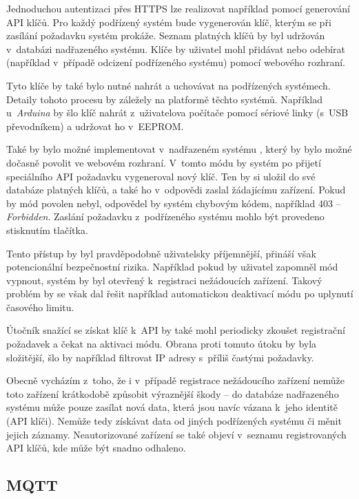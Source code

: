 Jednoduchou autentizaci přes HTTPS lze realizovat například pomocí generování API klíčů. Pro každý podřízený systém bude vygenerován klíč, kterým se při zasílání požadavku systém prokáže. Seznam platných klíčů by byl udržován v~databázi nadřazeného systému. Klíče by uživatel mohl přidávat nebo odebírat (například v~případě odcizení podřízeného systému) pomocí webového rozhraní.

Tyto klíče by také bylo nutné nahrát a uchovávat na podřízených systémech. Detaily tohoto procesu by záležely na platformě těchto systémů. Například u~\textit{Arduina} by šlo klíč nahrát z~uživatelova počítače pomocí sériové linky (s~USB převodníkem) a udržovat ho v~EEPROM.

Také by bylo možné implementovat v~nadřazeném systému , který by bylo možné dočasně povolit ve webovém rozhraní. V~tomto módu by systém po přijetí speciálního API požadavku vygeneroval nový klíč. Ten by si uložil do své databáze platných klíčů, a také ho v~odpovědi zaslal žádajícímu zařízení. Pokud by mód povolen nebyl, odpovědel by systém chybovým kódem, například 403 -- \textit{Forbidden}. Zaslání požadavku z~podřízeného systému mohlo být provedeno stisknutím tlačítka.

Tento přístup by byl pravděpodobně uživatelsky příjemnější, přináší však potencionální bezpečnostní rizika. Například pokud by uživatel zapomněl mód vypnout, systém by byl otevřený k~registraci nežádoucích zařízení. Takový problém by se však dal řešit například automatickou deaktivací módu po uplynutí časového limitu.

Útočník snažící se získat klíč k~API by také mohl periodicky zkoušet registrační požadavek a čekat na aktivaci módu. Obrana proti tomuto útoku by byla složitější, šlo by například filtrovat IP adresy s~příliš častými požadavky.

Obecně vycházím z~toho, že i v~případě registrace nežádoucího zařízení nemůže toto zařízení krátkodobě způsobit výraznější škody -- do databáze nadřazeného systému může pouze zasílat nová data, která jsou navíc vázana k~jeho identitě (API klíči). Nemůže tedy získávat data od jiných podřízených systému či měnit jejich záznamy. Neautorizované zařízení se také objeví v~seznamu registrovaných API klíčů, kde může být snadno odhaleno. 

\subsection{MQTT}
\label{sec:an_mqtt}

